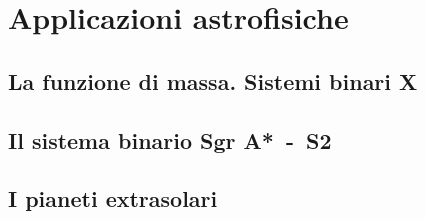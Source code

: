 \chapter{Applicazioni astrofisiche}
\label{chap:applicazioni}

\section{La funzione di massa. Sistemi binari X}
\label{sec:funzione-massa}

\section{Il sistema binario Sgr A*~-~S2}
\label{sec:sgra}

\section{I pianeti extrasolari}
\label{sec:extrasolari}

